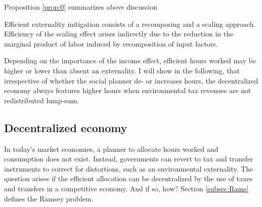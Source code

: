 Proposition \ref{prop:0} summarizes above discussion
\begin{prop}\label{prop:0}
	Efficient externality mitigation consists of a recomposing and a scaling approach. Efficiency of the scaling effect arises indirectly due to the reduction in the marginal product of labor induced by recomposition of input factors.
\end{prop}


Depending on the importance of the income effect, efficient hours worked may be higher or lower than  absent an externality. %
I will show in the following, that irrespective of whether the social planner de- or increases hours, the decentralized economy always features higher hours when environmental tax revenues are not redistributed lump-sum. 

\begin{comment}
\hrule
One can show that the total effect of a drop in the fossil labor share on hours worked is positive, i.e. $\frac{dh_{FB}}{ds}>0$, if $\theta<\frac{\varepsilon}{\varepsilon-s}$. If the income effect dominates, the social planner increases hours worked as the economy becomes less productive. 
Under the value for $\theta$ suggested by \cite{Boppart2019LaborPerspectiveb}, the efficient scale effect is to increase hours worked. When, however, the substitution effect outweighs or dominates the income effect - as commonly assumed in the public finance literature \citep{Heathcote2017OptimalFramework, LansBovenberg1994EnvironmentalTaxation, LansBovenberg1996OptimalAnalyses} \tr{CHECK this}!.
Nevertheless, the level of hours worked exceeds the efficient level irrespective of $\theta$ when no lump-sum transfers are available. 
When the efficient level of hours increases, though, the fossil labor share reduces even more to outweigh the increase in the externality.

content...
\end{comment}
\subsection{Decentralized economy}\label{subsec:decen_ec}

In today's market economies, a planner to allocate hours worked and consumption does not exist. Instead, governments can revert to tax and transfer instruments to correct for distortions, such as an environmental externality. The question arises if the efficient allocation can be decentralized by the use of taxes and transfers in a competitive economy. And if so, how? Section \ref{subsec:Rams} defines the Ramsey problem. %

